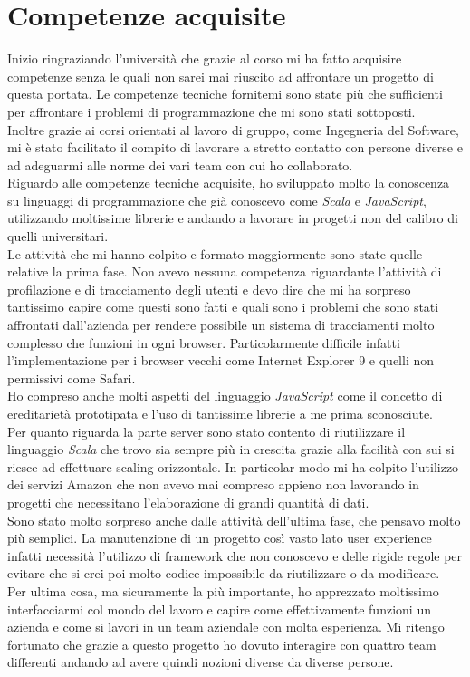 \documentclass[a4paper, 12pt, twoside, openright]{book}
\begin{document}
\section{Competenze acquisite}
Inizio ringraziando l'università che grazie al corso mi ha fatto acquisire competenze senza le quali non sarei mai riuscito ad affrontare un progetto di questa portata. Le competenze tecniche fornitemi sono state più che sufficienti per affrontare i problemi di programmazione che mi sono stati sottoposti.\\
Inoltre grazie ai corsi orientati al lavoro di gruppo, come Ingegneria del Software, mi è stato facilitato il compito di lavorare a stretto contatto con persone diverse e ad adeguarmi alle norme dei vari team con cui ho collaborato.\\

Riguardo alle competenze tecniche acquisite, ho sviluppato molto la conoscenza su linguaggi di programmazione che già conoscevo come \textit{Scala} e \textit{JavaScript}, utilizzando moltissime librerie e andando a lavorare in progetti non del calibro di quelli universitari.\\
Le attività che mi hanno colpito e formato maggiormente sono state quelle relative la prima fase. Non avevo nessuna competenza riguardante l'attività di profilazione e di tracciamento degli utenti e devo dire che mi ha sorpreso tantissimo capire come questi sono fatti e quali sono i problemi che sono stati affrontati dall'azienda per rendere possibile un sistema di tracciamenti molto complesso che funzioni in ogni browser. Particolarmente difficile infatti l'implementazione per i browser vecchi come Internet Explorer 9 e quelli non permissivi come Safari.\\
Ho compreso anche molti aspetti del linguaggio \textit{JavaScript} come il concetto di ereditarietà prototipata e l'uso di tantissime librerie a me prima sconosciute.\\
Per quanto riguarda la parte server sono stato contento di riutilizzare il linguaggio \textit{Scala} che trovo sia sempre più in crescita grazie alla facilità con sui si riesce ad effettuare scaling orizzontale. In particolar modo mi ha colpito l'utilizzo dei servizi Amazon che non avevo mai compreso appieno non lavorando in progetti che necessitano l'elaborazione di grandi quantità di dati.\\
Sono stato molto sorpreso anche dalle attività dell'ultima fase, che pensavo molto più semplici. La manutenzione di un progetto così vasto lato user experience infatti necessità l'utilizzo di framework che non conoscevo e delle rigide regole per evitare che si crei poi molto codice impossibile da riutilizzare o da modificare.\\
Per ultima cosa, ma sicuramente la più importante, ho apprezzato moltissimo interfacciarmi col mondo del lavoro e capire come effettivamente funzioni un azienda e come si lavori in un team aziendale con molta esperienza. Mi ritengo fortunato che grazie a questo progetto ho dovuto interagire con quattro team differenti andando ad avere quindi nozioni diverse da diverse persone.\\
\end{document}
